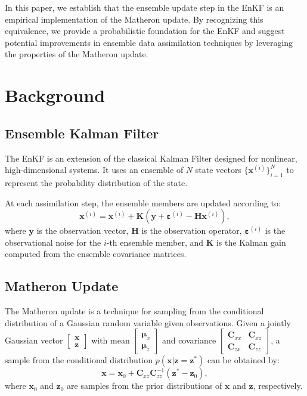 \documentclass{article}
\theoremstyle{plain}
\begin{document}
In this paper, we establish that the ensemble update step in the EnKF is an empirical implementation of the Matheron update. By recognizing this equivalence, we provide a probabilistic foundation for the EnKF and suggest potential improvements in ensemble data assimilation techniques by leveraging the properties of the Matheron update.

\section{Background}

\subsection{Ensemble Kalman Filter}
The EnKF is an extension of the classical Kalman Filter designed for nonlinear, high-dimensional systems. It uses an ensemble of $N$ state vectors $\{\mathbf{x}^{(i)}\}_{i=1}^N$ to represent the probability distribution of the state.

At each assimilation step, the ensemble members are updated according to:
\begin{equation}
    \mathbf{x}^{(i)} = \mathbf{x}^{(i)} + \mathbf{K} \left( \mathbf{y} + \boldsymbol{\varepsilon}^{(i)} - \mathbf{H} \mathbf{x}^{(i)} \right),
    \label{eq:enkf_update}
\end{equation}
where $\mathbf{y}$ is the observation vector, $\mathbf{H}$ is the observation operator, $\boldsymbol{\varepsilon}^{(i)}$ is the observational noise for the $i$-th ensemble member, and $\mathbf{K}$ is the Kalman gain computed from the ensemble covariance matrices.

\subsection{Matheron Update}
The Matheron update is a technique for sampling from the conditional distribution of a Gaussian random variable given observations. Given a jointly Gaussian vector $\begin{bmatrix} \mathbf{x} \\ \mathbf{z} \end{bmatrix}$ with mean $\begin{bmatrix} \boldsymbol{\mu}_x \\ \boldsymbol{\mu}_z \end{bmatrix}$ and covariance $\begin{bmatrix} \mathbf{C}_{xx} & \mathbf{C}_{xz} \\ \mathbf{C}_{zx} & \mathbf{C}_{zz} \end{bmatrix}$, a sample from the conditional distribution $p(\mathbf{x} | \mathbf{z} = \mathbf{z}^*)$ can be obtained by:
\begin{equation}
    \mathbf{x} = \mathbf{x}_0 + \mathbf{C}_{xz} \mathbf{C}_{zz}^{-1} \left( \mathbf{z}^* - \mathbf{z}_0 \right),
    \label{eq:matheron_update}
\end{equation}
where $\mathbf{x}_0$ and $\mathbf{z}_0$ are samples from the prior distributions of $\mathbf{x}$ and $\mathbf{z}$, respectively.
\end{document}
